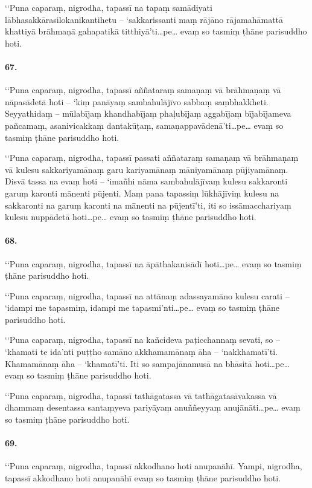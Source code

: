 ‘‘Puna caparaṃ, nigrodha, tapassī na tapaṃ samādiyati lābhasakkārasilokanikantihetu – ‘sakkarissanti maṃ rājāno rājamahāmattā khattiyā brāhmaṇā gahapatikā titthiyā’ti…pe… evaṃ so tasmiṃ ṭhāne parisuddho hoti.

\paragraph{67.} ‘‘Puna caparaṃ, nigrodha, tapassī aññataraṃ samaṇaṃ vā brāhmaṇaṃ vā nāpasādetā hoti – ‘kiṃ panāyaṃ sambahulājīvo sabbaṃ saṃbhakkheti. Seyyathidaṃ – mūlabījaṃ khandhabījaṃ phaḷubījaṃ aggabījaṃ bījabījameva pañcamaṃ, asanivicakkaṃ dantakūṭaṃ, samaṇappavādenā’ti…pe… evaṃ so tasmiṃ ṭhāne parisuddho hoti.

‘‘Puna caparaṃ, nigrodha, tapassī passati aññataraṃ samaṇaṃ vā brāhmaṇaṃ vā kulesu sakkariyamānaṃ garu kariyamānaṃ māniyamānaṃ pūjiyamānaṃ. Disvā tassa na evaṃ hoti – ‘imañhi nāma sambahulājīvaṃ kulesu sakkaronti garuṃ karonti mānenti pūjenti. Maṃ pana tapassiṃ lūkhājīviṃ kulesu na sakkaronti na garuṃ karonti na mānenti na pūjentī’ti, iti so issāmacchariyaṃ kulesu nuppādetā hoti…pe… evaṃ so tasmiṃ ṭhāne parisuddho hoti.

\paragraph{68.} ‘‘Puna caparaṃ, nigrodha, tapassī na āpāthakanisādī hoti…pe… evaṃ so tasmiṃ ṭhāne parisuddho hoti.

‘‘Puna caparaṃ, nigrodha, tapassī na attānaṃ adassayamāno kulesu carati – ‘idampi me tapasmiṃ, idampi me tapasmi’nti…pe… evaṃ so tasmiṃ ṭhāne parisuddho hoti.

‘‘Puna caparaṃ, nigrodha, tapassī na kañcideva paṭicchannaṃ sevati, so – ‘khamati te ida’nti puṭṭho samāno akkhamamānaṃ āha – ‘nakkhamatī’ti. Khamamānaṃ āha – ‘khamatī’ti. Iti so sampajānamusā na bhāsitā hoti…pe… evaṃ so tasmiṃ ṭhāne parisuddho hoti.

‘‘Puna caparaṃ, nigrodha, tapassī tathāgatassa vā tathāgatasāvakassa vā dhammaṃ desentassa santaṃyeva pariyāyaṃ anuññeyyaṃ anujānāti…pe… evaṃ so tasmiṃ ṭhāne parisuddho hoti.

\paragraph{69.} ‘‘Puna caparaṃ, nigrodha, tapassī akkodhano hoti anupanāhī. Yampi, nigrodha, tapassī akkodhano hoti anupanāhī evaṃ so tasmiṃ ṭhāne parisuddho hoti.

